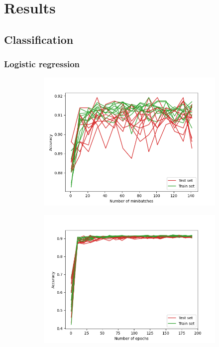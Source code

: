 \documentclass[../main.tex]{subfiles}
\begin{document}
\section{Results}
\subsection{Classification}
\subsubsection{Logistic regression}


\begin{figure}[H] 
   \centering
   \begin{subfigure}[b]{0.45\textwidth}
      \centering
    \includegraphics[width=\textwidth]{../assets/acc_vs_mb_set_40.png}
    \caption{}
    \label{fig:accvsepoch}
   \end{subfigure}
   \quad
   \begin{subfigure}[b]{0.45\textwidth}
    \centering
    \includegraphics[width=\textwidth]{../assets/acc_vs_epoch_set_110.png} 

\end{subfigure}
\end{figure}
\end{document}
